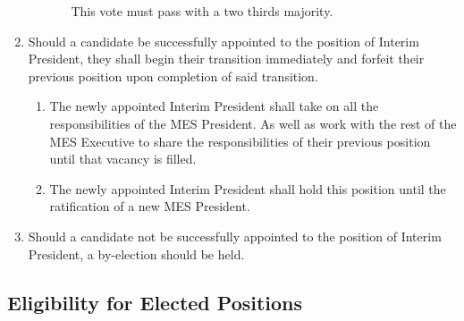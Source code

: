 \begin{enumerate}
\begin{enumerate}
\begin{enumerate}
      This vote must pass with a two thirds majority.
    \end{enumerate}
   \end{enumerate}
   \item 
   Should a candidate be successfully appointed to the position of Interim President, they shall begin their transition immediately and forfeit their previous position upon completion of said transition.
   \begin{enumerate}
    \item
     The newly appointed Interim President shall take on all the responsibilities of the MES President. As well as work with the rest of the MES Executive to share the responsibilities of their previous position until that vacancy is filled.
    \item
     The newly appointed Interim President shall hold this position until the ratification of a new MES President.
   \end{enumerate}
  \item 
   Should a candidate not be successfully appointed to the position of Interim President, a by-election should be held.
\end{enumerate}

\subsection{Eligibility for Elected Positions}
\label{eligibility-for-elected-positions}

